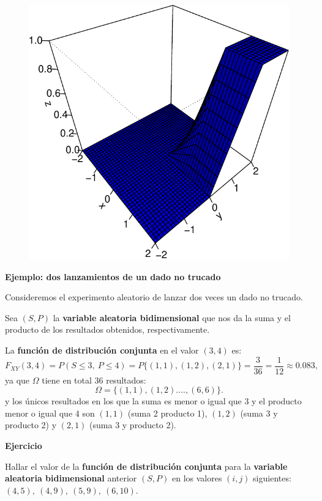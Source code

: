 \documentclass[
  letterpaper,
  DIV=11,
  numbers=noendperiod]{scrreprt}
\begin{document}
\begin{figure}[H]

{\centering \includegraphics{5_files/figure-pdf/unnamed-chunk-1-1.pdf}

}

\end{figure}

\textbf{Ejemplo: dos lanzamientos de un dado no trucado}

Consideremos el experimento aleatorio de lanzar dos veces un dado no
trucado.

Sea \((S,P)\) la \textbf{variable aleatoria bidimensional} que nos da la
suma y el producto de los resultados obtenidos, respectivamente.

La \textbf{función de distribución conjunta} en el valor \((3,4)\) es:
\[
F_{XY}(3,4) = P(S\leq 3,\ P\leq 4)=P\{(1,1), (1,2), (2,1) \}=\frac{3}{36}=\frac{1}{12}\approx 0.083, 
\] ya que \(\Omega\) tiene en total \(36\) resultados: \[
\Omega =\{(1,1),(1,2).\ldots, (6,6)\}.
\] y los únicos resultados en los que la suma es menor o igual que 3 y
el producto menor o igual que 4 son \((1,1)\) (suma 2 producto 1),
\((1,2)\) (suma 3 y producto 2) y \((2,1)\) (suma 3 y producto 2).

\textbf{Ejercicio}

Hallar el valor de la \textbf{función de distribución conjunta} para la
\textbf{variable aleatoria bidimensional} anterior \((S,P)\) en los
valores \((i,j)\) siguientes: \((4,5),\ (4,9),\ (5,9),\ (6,10)\).
\end{document}
